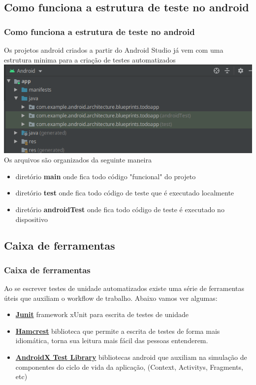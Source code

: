 \documentclass{beamer}
\begin{document}
\subsection{Como funciona a estrutura de teste no android}
\begin{frame}
	\frametitle{Como funciona a estrutura de teste no android}
	Os projetos android criados a partir do Android Studio já vem com uma estrutura minima para a criação de testes automatizados
	\includegraphics[scale=0.5]{test_structure_android}
	\newline Os arquivos são organizados da seguinte maneira
	\begin{itemize}
		\item diretório \textbf{main} onde fica todo código "funcional" do projeto
		\item diretório \textbf{test} onde fica todo código de teste que é executado localmente 
		\item diretório \textbf{androidTest} onde fica todo código de teste é executado no dispositivo
	\end{itemize}
	
\end{frame}

\subsection{Caixa de ferramentas}
\begin{frame}
	\frametitle{Caixa de ferramentas}
	Ao se escrever testes de unidade automatizados existe uma série de ferramentas úteis que auxiliam o workflow de trabalho. Abaixo vamos ver algumas:
	\newline 
	\begin{itemize}
		\item \href{https://junit.org/junit4/}{\textbf{Junit}} framework xUnit para escrita de testes de unidade
		\item \href{http://hamcrest.org/}{\textbf{Hamcrest}} biblioteca que permite a escrita de testes de forma mais idiomática, torna sua leitura mais fácil das pessoas entenderem.
		\item \href{https://developer.android.com/training/testing/set-up-project}
		{\textbf{AndroidX Test Library}} bibliotecas android que auxiliam na simulação de componentes do ciclo de vida da aplicação, (Context, Activitys, Fragments, etc)
		

	\end{itemize}
	
\end{frame}
\end{document}

